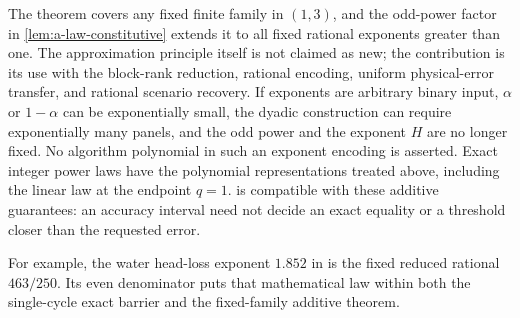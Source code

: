 The theorem covers any fixed finite family in $(1,3)$, and the
odd-power factor in \cref{lem:a-law-constitutive} extends it to all
fixed rational exponents greater than one. The approximation principle
itself is not claimed as new; the contribution is its use with the
block-rank reduction, rational encoding, uniform physical-error
transfer, and rational scenario recovery. If exponents are arbitrary
binary input, $\alpha$ or $1-\alpha$ can be exponentially small, the
dyadic construction can require exponentially many panels, and the odd
power and the exponent $H$ are no longer fixed. No algorithm polynomial
in such an exponent encoding is asserted. Exact integer power laws have
the polynomial representations treated above, including the linear law
at the endpoint $q=1$.  is compatible with these
additive guarantees: an accuracy interval need not decide an exact
equality or a threshold closer than the requested error.

For example, the water head-loss exponent $1.852$ in
\citet[Example 2.3, May 2018 manuscript]{gro2017-algorithmic-results-for-potential-based}
is the fixed reduced rational $463/250$. Its even denominator puts that
mathematical law within both the single-cycle exact barrier and the
fixed-family additive theorem.
